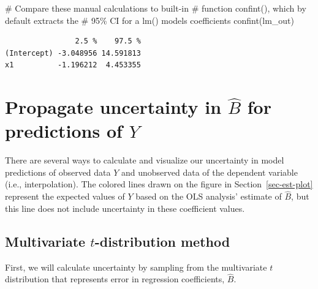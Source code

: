\documentclass[
  letterpaper,
  DIV=11,
  numbers=noendperiod]{scrreprt}
\newenvironment{Shaded}{\begin{snugshade}}{\end{snugshade}}
\newcommand{\CommentTok}[1]{\textcolor[rgb]{0.37,0.37,0.37}{#1}}
\newcommand{\FunctionTok}[1]{\textcolor[rgb]{0.28,0.35,0.67}{#1}}
\newcommand{\NormalTok}[1]{\textcolor[rgb]{0.00,0.23,0.31}{#1}}
\begin{document}
\begin{Shaded}
\begin{Highlighting}[]
\CommentTok{\# Compare these manual calculations to built{-}in}
\CommentTok{\# function confint(), which by default extracts the }
\CommentTok{\# 95\% CI for a lm() model\textquotesingle{}s coefficients}
\FunctionTok{confint}\NormalTok{(lm\_out)}
\end{Highlighting}
\end{Shaded}

\begin{verbatim}
                2.5 %    97.5 %
(Intercept) -3.048956 14.591813
x1          -1.196212  4.453355
\end{verbatim}

\hypertarget{propagate-uncertainty-in-hatb-for-predictions-of-y}{%
\section{\texorpdfstring{Propagate uncertainty in \(\hat{B}\) for
predictions of
\(Y\)}{Propagate uncertainty in \textbackslash hat\{B\} for predictions of Y}}\label{propagate-uncertainty-in-hatb-for-predictions-of-y}}

There are several ways to calculate and visualize our uncertainty in
model predictions of observed data \(Y\) and unobserved data of the
dependent variable (i.e., interpolation). The colored lines drawn on the
figure in Section~\ref{sec-est-plot} represent the expected values of
\(Y\) based on the OLS analysis' estimate of \(\hat{B}\), but this line
does not include uncertainty in these coefficient values.

\hypertarget{multivariate-t-distribution-method}{%
\subsection{\texorpdfstring{Multivariate \(t\)-distribution
method}{Multivariate t-distribution method}}\label{multivariate-t-distribution-method}}

First, we will calculate uncertainty by sampling from the multivariate
\(t\) distribution that represents error in regression coefficients,
\(\hat{B}\).
\end{document}
